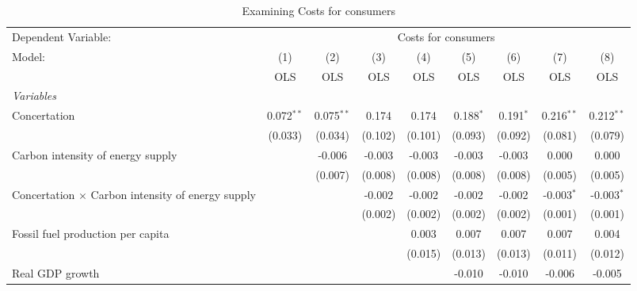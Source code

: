 
\begin{table}[htbp]
   \caption{Examining Costs for consumers}
   \centering
   \begin{tabular}{lcccccccc}
      \toprule
      Dependent Variable: & \multicolumn{8}{c}{Costs for consumers}\\
      Model:                                                   & (1)          & (2)          & (3)     & (4)     & (5)         & (6)         & (7)          & (8)\\  
                                                               &  OLS         & OLS          & OLS     & OLS     & OLS         & OLS         & OLS          & OLS\\  
      \midrule
      \emph{Variables}\\
      Concertation                                             & 0.072$^{**}$ & 0.075$^{**}$ & 0.174   & 0.174   & 0.188$^{*}$ & 0.191$^{*}$ & 0.216$^{**}$ & 0.212$^{**}$\\   
                                                               & (0.033)      & (0.034)      & (0.102) & (0.101) & (0.093)     & (0.092)     & (0.081)      & (0.079)\\   
      Carbon intensity of energy supply                        &              & -0.006       & -0.003  & -0.003  & -0.003      & -0.003      & 0.000        & 0.000\\   
                                                               &              & (0.007)      & (0.008) & (0.008) & (0.008)     & (0.008)     & (0.005)      & (0.005)\\   
      Concertation $\times$ Carbon intensity of energy supply  &              &              & -0.002  & -0.002  & -0.002      & -0.002      & -0.003$^{*}$ & -0.003$^{*}$\\   
                                                               &              &              & (0.002) & (0.002) & (0.002)     & (0.002)     & (0.001)      & (0.001)\\   
      Fossil fuel production per capita                        &              &              &         & 0.003   & 0.007       & 0.007       & 0.007        & 0.004\\   
                                                               &              &              &         & (0.015) & (0.013)     & (0.013)     & (0.011)      & (0.012)\\   
      Real GDP growth                                          &              &              &         &         & -0.010      & -0.010      & -0.006       & -0.005\\   

\end{tabular}
\end{table}
